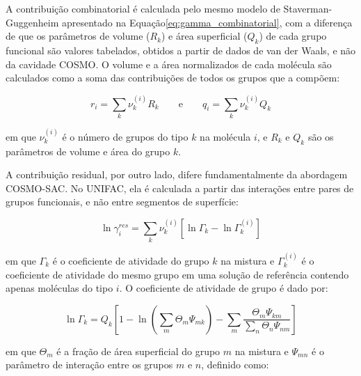 A contribuição combinatorial é calculada pelo mesmo modelo de Staverman-Guggenheim apresentado na Equação\ref{eq:gamma_combinatorial}, com a diferença de que os parâmetros de volume ($R_k$) e área superficial ($Q_k$) de cada grupo funcional são valores tabelados, obtidos a partir de dados de van der Waals, e não da cavidade COSMO\cite{fredenslund1975}. O volume e a área normalizados de cada molécula são calculados como a soma das contribuições de todos os grupos que a compõem:

\begin{equation}
    r_i = \sum_{k} \nu_k^{(i)} R_k \qquad \text{e} \qquad
    q_i = \sum_{k} \nu_k^{(i)} Q_k
    \label{eq:rq_unifac}
\end{equation}

\noindent em que $\nu_k^{(i)}$ é o número de grupos do tipo $k$ na molécula $i$, e $R_k$ e $Q_k$ são os parâmetros de volume e área do grupo $k$.


A contribuição residual, por outro lado, difere fundamentalmente da abordagem COSMO-SAC. No UNIFAC, ela é calculada a partir das interações entre pares de grupos funcionais, e não entre segmentos de superfície\cite{fredenslund1975}:

\begin{equation}
    \ln \gamma_i^{res} = \sum_{k} \nu_k^{(i)}
    \left[ \ln \Gamma_k - \ln \Gamma_k^{(i)} \right]
    \label{eq:gamma_res_unifac}
\end{equation}

\noindent em que $\Gamma_k$ é o coeficiente de atividade do grupo $k$ na mistura e $\Gamma_k^{(i)}$ é o coeficiente de atividade do mesmo grupo em uma solução de referência contendo apenas moléculas do tipo $i$. O coeficiente de atividade de grupo é dado por\cite{fredenslund1975}:

\begin{equation}
    \ln \Gamma_k = Q_k \left[
    1 - \ln\!\left(\sum_{m} \Theta_m \Psi_{mk}\right)
    - \sum_{m} \frac{\Theta_m \Psi_{km}}
                    {\displaystyle\sum_{n} \Theta_n \Psi_{nm}}
    \right]
    \label{eq:gamma_grupo}
\end{equation}

\noindent em que $\Theta_m$ é a fração de área superficial do grupo $m$ na mistura e $\Psi_{mn}$ é o parâmetro de interação entre os grupos $m$ e $n$, definido como:

